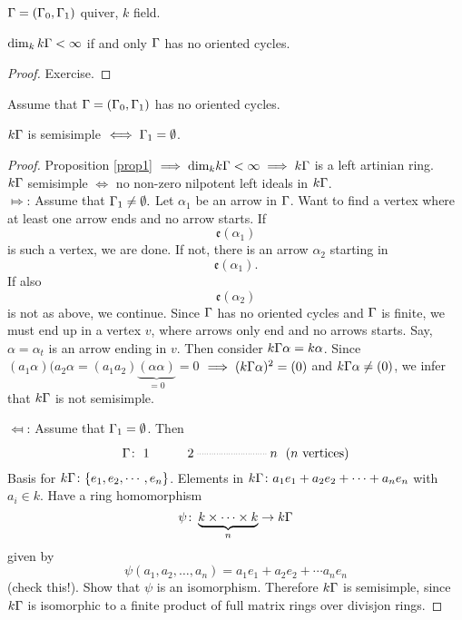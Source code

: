 \begin{prop}\label{prop1}
  $\Gamma = (\Gamma_0,\Gamma_1)$ quiver, $k$ field.
\begin{center}
  $\dim_kk\Gamma < \infty$ if and only $\Gamma$ has no oriented cycles.
\end{center}
\end{prop}
\begin{proof}
  Exercise.
\end{proof}

\begin{prop}
  Assume that $\Gamma=(\Gamma_0,\Gamma_1)$ has no oriented cycles. 
\begin{center}
$k\Gamma$ is semisimple $\iff \Gamma_1 = \emptyset$.
\end{center}
\end{prop}

\begin{proof}
  Proposition \ref{prop1} $ \implies \text{dim}_kk\Gamma < \infty \implies k\Gamma$ is a left artinian ring. \\
  $k\Gamma$ semisimple $\iff $ no non-zero nilpotent left ideals in $k\Gamma$.\\

  $\Mapsto$: Assume that $\Gamma_1\neq\emptyset.$ Let $\alpha_1$ be an
  arrow in $\Gamma$. Want to find a vertex where at least one arrow ends
  and no arrow starts. If
\[\mathfrak{e}(\alpha_1)\] 
is such a vertex, we are done. If not, there is an arrow $\alpha_2$
starting in
\[\mathfrak{e}(\alpha_1).\] 
If also
\[\mathfrak{e}(\alpha_2)\] 
is not as above, we continue. Since $\Gamma$ has no oriented cycles and
$\Gamma$ is finite, we must end up in a vertex $ v$, where arrows only end
and no arrows starts. Say, $\alpha = \alpha_t$ is an arrow ending in
$v$. Then consider $k\Gamma\alpha = k\alpha$.  Since
$(a_1\alpha)(a_2\alpha = (a_1a_2)\underbrace{(\alpha\alpha)}_{=0} =
0$ $\implies (k\Gamma\alpha)^2=(0)$ and $k\Gamma\alpha \neq (0)$, we infer
that $k\Gamma$ is not semisimple.

$\Mapsfrom$: Assume that $\Gamma_1 = \emptyset$. Then 
\[\G\colon \xymatrix{1 & 2\ar@{..}[rr] & &  n} \text{ ($n$ vertices)}\]
  Basis for $k\Gamma\colon \{e_1, e_2, \cdots, e_n\}$. Elements in
  $k\Gamma\colon a_1e_1 + a_2e_2 + \cdots + a_ne_n$ with $a_i \in k$. Have
  a ring homomorphism
\[\psi\colon \underbrace{k \times \cdots \times k}_{n}  \rightarrow k\Gamma\]
  given by
\[\psi(a_1,a_2,\ldots,a_n)=a_1e_1 + a_2e_2+ \cdots a_ne_n\] 
(check this!).  Show that $\psi$ is an isomorphism. Therefore $k\Gamma$ is
  semisimple, since $k\Gamma$ is isomorphic to a finite product of full
  matrix rings over divisjon rings.
\end{proof}

